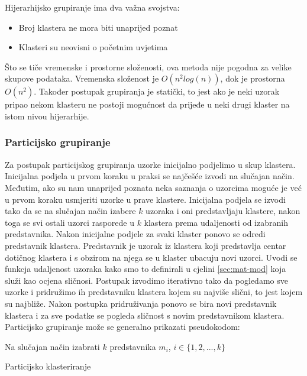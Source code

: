 \documentclass[a4paper,twoside,12pt]{memoir} %
\begin{document}
Hijerarhijsko grupiranje ima dva važna svojstva:
\begin{itemize}
\item Broj klastera ne mora biti unaprijed poznat
\item Klasteri su neovisni o početnim uvjetima
\end{itemize}
Što se tiče vremenske i prostorne složenosti, ova metoda nije pogodna za  velike skupove podataka. Vremenska složenost je $O(n^2log(n))$, dok je prostorna $O(n^2)$. Također postupak grupiranja je statički, to jest ako je neki uzorak pripao nekom klasteru ne postoji mogućnost da prijeđe u neki drugi klaster na istom nivou hijerarhije.
\subsubsection{Particijsko grupiranje}
Za postupak particijskog grupiranja uzorke inicijalno podjelimo u skup klastera. Inicijalna podjela u prvom koraku u praksi se najčešće izvodi na slučajan način. Međutim, ako su nam unaprijed poznata neka saznanja o uzorcima moguće je već u prvom koraku usmjeriti uzorke u prave klastere. Inicijalna podjela se izvodi tako da se na slučajan način izabere $k$ uzoraka i oni predstavljaju klastere, nakon toga se svi ostali uzorci rasporede u $k$ klastera prema udaljenosti od izabranih predstavnika. Nakon inicijalne podjele za svaki klaster ponovo se odredi predstavnik klastera. Predstavnik je uzorak iz klastera koji predstavlja centar dotičnog klastera i s obzirom na njega se u klaster ubacuju novi uzorci. Uvodi se funkcja udaljenost uzoraka kako smo to definirali u cjelini \ref{sec:mat-mod} koja služi kao ocjena sličnosi. Postupak izvodimo iterativno tako da pogledamo sve uzorke i pridružimo ih predstavniku klastera kojem su najviše slični, to jest kojem su najbliže. Nakon postupka pridruživanja ponovo se bira novi predstavnik klastera i za sve podatke se pogleda sličnost s novim predstavnikom klastera. 
Particijsko grupiranje može se generalno prikazati pseudokodom:\\
\begin{algorithm}[H]
 Na slučajan način izabrati $k$ predstavnika $m_i$, $i \in \{1,2,...,k\}$\;
 \caption{Particijsko klasteriranje}
\end{algorithm}
\end{document}

